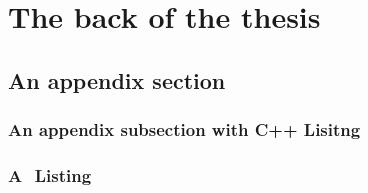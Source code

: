 \documentclass[a4paper,11pt]{mscThesis}
\begin{document}
    \chapter{The back of the thesis}

    \section{An appendix section}
    

    \subsection{An appendix subsection with C++ Lisitng}

    \lstset{language=C++}
    

    \subsection{A \matlab $ $ Listing}

    \lstset{language=matlab}
    
    
\begin{comment}
	


    \chapter{Yet another appendix}

    \section{Another test section}

    Ok, all is well.

    \printindex%
    \cleardoublepage%
    
\end{comment}
   
\end{document}
